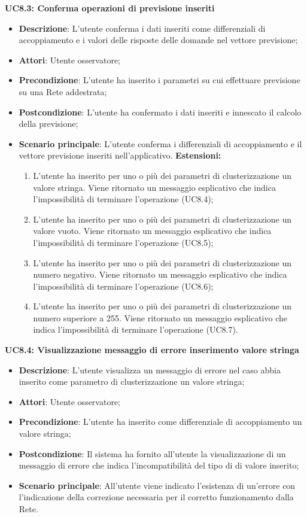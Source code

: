 \textbf{UC8.3: Conferma operazioni di previsione inseriti}\mbox{}
\label{UC8.3: Conferma operazioni di previsione inseriti}
\noindent
\begin{itemize}
\item \textbf{Descrizione}: L'utente conferma i dati inseriti come differenziali di accoppiamento e i valori delle risposte delle domande nel vettore previsione;
\item \textbf{Attori}: Utente osservatore;
\item \textbf{Precondizione}: L'utente ha inserito i parametri su cui effettuare previsione su una Rete addestrata;
\item \textbf{Postcondizione}: L'utente ha confermato i dati inseriti e innescato il calcolo della previsione;
\item \textbf{Scenario principale}: L'utente conferma i differenziali di accoppiamento e il vettore previsione inseriti nell'applicativo.
\textbf{Estensioni:}
\begin{enumerate}
\item L'utente ha inserito per uno o pi\`u dei parametri di clusterizzazione un valore stringa. Viene ritornato un messaggio esplicativo che indica l'impossibilit\`a di terminare l'operazione (UC8.4);
\item L'utente ha inserito per uno o pi\`u dei parametri di clusterizzazione un valore vuoto. Viene ritornato un messaggio esplicativo che indica l'impossibilit\`a di terminare l'operazione (UC8.5);
\item L'utente ha inserito per uno o pi\`u dei parametri di clusterizzazione un numero negativo. Viene ritornato un messaggio esplicativo che indica l'impossibilit\`a di terminare l'operazione (UC8.6);
\item L'utente ha inserito per uno o pi\`u dei parametri di clusterizzazione un numero superiore a 255. Viene ritornato un messaggio esplicativo che indica l'impossibilit\`a di terminare l'operazione (UC8.7).
\end{enumerate}
\end{itemize}

\textbf{UC8.4: Visualizzazione messaggio di errore inserimento valore stringa}\mbox{}
\label{UC8.4: Visualizzazione messaggio di errore per inserimento valore stringa}
\noindent
\begin{itemize}
\item \textbf{Descrizione}: L'utente visualizza un messaggio di errore nel caso abbia inserito come parametro di clusterizzazione un valore stringa;
\item \textbf{Attori}: Utente osservatore;
\item \textbf{Precondizione}: L'utente ha inserito come differenziale di accoppiamento un valore stringa;
\item \textbf{Postcondizione}: Il sistema ha fornito all'utente la visualizzazione di un messaggio di errore che indica  l'incompatibilit\`a del tipo di  di valore inserito;
\item \textbf{Scenario principale}: All'utente viene indicato l'esistenza di un'errore con l'indicazione della correzione necessaria per il corretto funzionamento dalla Rete.
\end{itemize}

